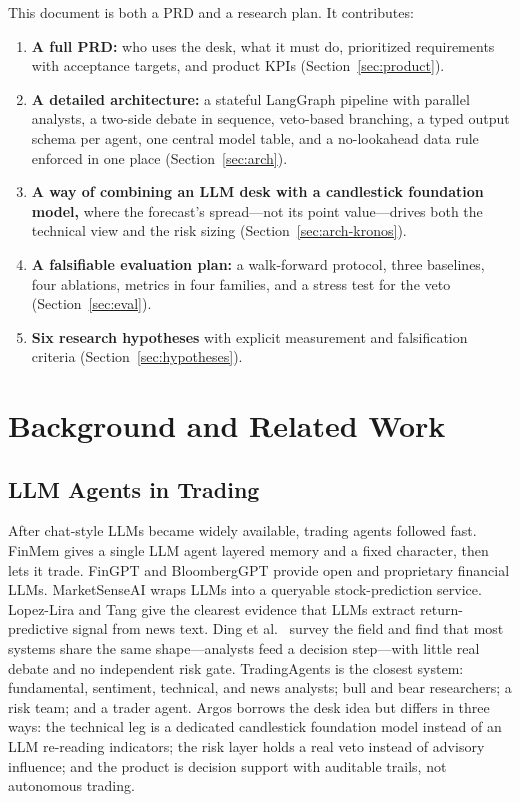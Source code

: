 \documentclass[conference]{IEEEtran}
\newcommand{\sys}{Argos}
\begin{document}
This document is both a PRD and a research plan. It contributes:

\begin{enumerate}[leftmargin=*,itemsep=1pt,topsep=2pt]
  \item \textbf{A full PRD:} who uses the desk, what it must do, prioritized requirements with acceptance targets, and product KPIs (Section~\ref{sec:product}).
  \item \textbf{A detailed architecture:} a stateful LangGraph pipeline with parallel analysts, a two-side debate in sequence, veto-based branching, a typed output schema per agent, one central model table, and a no-lookahead data rule enforced in one place (Section~\ref{sec:arch}).
  \item \textbf{A way of combining an LLM desk with a candlestick foundation model,} where the forecast's spread---not its point value---drives both the technical view and the risk sizing (Section~\ref{sec:arch-kronos}).
  \item \textbf{A falsifiable evaluation plan:} a walk-forward protocol, three baselines, four ablations, metrics in four families, and a stress test for the veto (Section~\ref{sec:eval}).
  \item \textbf{Six research hypotheses} with explicit measurement and falsification criteria (Section~\ref{sec:hypotheses}).
\end{enumerate}

\section{Background and Related Work}
\label{sec:related}

\subsection{LLM Agents in Trading}
After chat-style LLMs became widely available, trading agents followed fast. FinMem \cite{yu2023finmem} gives a single LLM agent layered memory and a fixed character, then lets it trade. FinGPT \cite{yang2023fingpt} and BloombergGPT \cite{wu2023bloomberggpt} provide open and proprietary financial LLMs. MarketSenseAI \cite{fatouros2024marketsenseai} wraps LLMs into a queryable stock-prediction service. Lopez-Lira and Tang \cite{lopezlira2023chatgpt} give the clearest evidence that LLMs extract return-predictive signal from news text. Ding et al.\ \cite{ding2024llmtrading} survey the field and find that most systems share the same shape---analysts feed a decision step---with little real debate and no independent risk gate. TradingAgents \cite{xiao2024tradingagents} is the closest system: fundamental, sentiment, technical, and news analysts; bull and bear researchers; a risk team; and a trader agent. \sys{} borrows the desk idea but differs in three ways: the technical leg is a dedicated candlestick foundation model instead of an LLM re-reading indicators; the risk layer holds a real veto instead of advisory influence; and the product is decision support with auditable trails, not autonomous trading.
\end{document}
